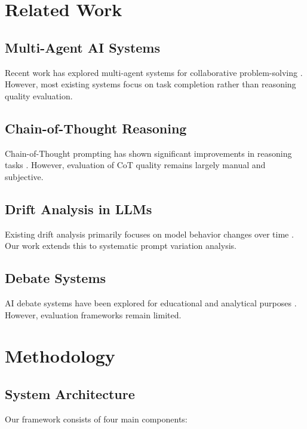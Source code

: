 \documentclass[11pt]{article}
\begin{document}
\section{Related Work}

\subsection{Multi-Agent AI Systems}

Recent work has explored multi-agent systems for collaborative problem-solving \cite{wang2023multiagent, chen2024collaborative}. However, most existing systems focus on task completion rather than reasoning quality evaluation.

\subsection{Chain-of-Thought Reasoning}

Chain-of-Thought prompting has shown significant improvements in reasoning tasks \cite{wei2022chain, kojima2022large}. However, evaluation of CoT quality remains largely manual and subjective.

\subsection{Drift Analysis in LLMs}

Existing drift analysis primarily focuses on model behavior changes over time \cite{liu2023drift, zhang2024evaluation}. Our work extends this to systematic prompt variation analysis.

\subsection{Debate Systems}

AI debate systems have been explored for educational and analytical purposes \cite{smith2023debate, johnson2024legislative}. However, evaluation frameworks remain limited.

\section{Methodology}

\subsection{System Architecture}

Our framework consists of four main components:
\end{document}
